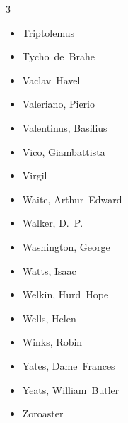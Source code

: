 \documentclass[10pt,makeidx]{extreport}
\newcommand\fleuron{\begin{turn}{45}\Large \ding{166}\end{turn}}
\newcommand\doublefleuron{%
	\reflectbox{\fleuron}\AC\staveXLIX\reflectbox{\AC}\fleuron}
\newcommand\fleuronbar{%
	{\huge\LinearACCCXIII}\xrfill[1.3ex]{1pt}\doublefleuron\xrfill[1.3ex]{1pt}\reflectbox{\huge\LinearACCCXIII}}
\newcommand\nbvspace[1][3]{\vspace*{\stretch{#1}}}
\begin{document}
\begin{multicols}{3}
\begin{itemize}
		\item Triptolemus
		\item Tycho~de~Brahe
		\item Vaclav~Havel
		\item Valeriano, Pierio
		\item Valentinus, Basilius
		\item Vico, Giambattista
		\item Virgil
		\item Waite, Arthur~Edward
		\item Walker, D.~P.
		\item Washington, George
		\item Watts, Isaac
		\item Welkin, Hurd~Hope
		\item Wells, Helen
		\item Winks, Robin
		\item Yates, Dame~Frances
		\item Yeats, William~Butler
		\item Zoroaster
	\end{itemize}
\end{multicols}



\bigskip
\begin{center}
\vfill
\shadowoffset{1pt}
\shadowtext{%
{\color{Mahogany}\fontsize{60}{64}\Saturn}}\\
\nbvspace[1]
\end{center}
\end{document}
